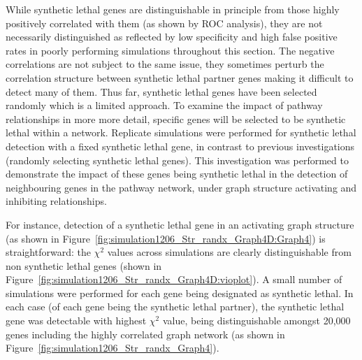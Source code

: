 While \gls{synthetic lethal} genes are distinguishable in principle from those highly positively correlated with them (as shown by \gls{ROC} analysis), they are not necessarily distinguished as reflected by low specificity and high false positive rates in poorly performing simulations throughout this section. The negative correlations are not subject to the same issue, they sometimes perturb the correlation structure between \gls{synthetic lethal} partner genes making it difficult to detect many of them. Thus far, \gls{synthetic lethal} genes have been selected randomly which is a limited approach. To examine the impact of pathway relationships in more more detail, specific genes will be selected to be \gls{synthetic lethal} within a network. Replicate simulations were performed for \gls{synthetic lethal} detection with a fixed \gls{synthetic lethal} gene, in contrast to previous investigations (randomly selecting \gls{synthetic lethal} genes). This investigation was performed to demonstrate the impact of these genes being \gls{synthetic lethal} in the detection of neighbouring genes in the pathway network, under \gls{graph} structure activating and inhibiting relationships.

For instance, detection of a \gls{synthetic lethal} gene in an activating \gls{graph} structure (as shown in Figure~\ref{fig:simulation1206_Str_randx_Graph4D:Graph4}) is straightforward: the $\chi^2$ values across simulations are clearly distinguishable from non \gls{synthetic lethal} genes (shown in Figure~\ref{fig:simulation1206_Str_randx_Graph4D:vioplot}). A small number of simulations were performed for each gene being designated as \gls{synthetic lethal}. In each case (of each gene being the \gls{synthetic lethal} partner), the \gls{synthetic lethal} gene was detectable with highest $\chi^2$ value, being distinguishable amongst 20,000 genes including the highly correlated graph network (as shown in Figure~\ref{fig:simulation1206_Str_randx_Graph4}).


